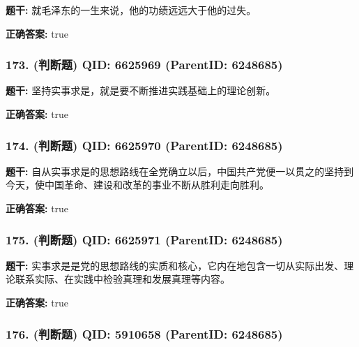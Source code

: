 \documentclass[12pt,UTF8]{ctexart}
\begin{document}
\textbf{题干:}
就毛泽东的一生来说，他的功绩远远大于他的过失。



\textbf{正确答案:}
true

\vspace{0.3em}\hrulefill\vspace{0.7em}

\subsubsection*{173. (判断题) \small QID: 6625969 (ParentID: 6248685)}

\textbf{题干:}
坚持实事求是，就是要不断推进实践基础上的理论创新。



\textbf{正确答案:}
true

\vspace{0.3em}\hrulefill\vspace{0.7em}

\subsubsection*{174. (判断题) \small QID: 6625970 (ParentID: 6248685)}

\textbf{题干:}
自从实事求是的思想路线在全党确立以后，中国共产党便一以贯之的坚持到今天，使中国革命、建设和改革的事业不断从胜利走向胜利。



\textbf{正确答案:}
true

\vspace{0.3em}\hrulefill\vspace{0.7em}

\subsubsection*{175. (判断题) \small QID: 6625971 (ParentID: 6248685)}

\textbf{题干:}
实事求是是党的思想路线的实质和核心，它内在地包含一切从实际出发、理论联系实际、在实践中检验真理和发展真理等内容。



\textbf{正确答案:}
true

\vspace{0.3em}\hrulefill\vspace{0.7em}

\subsubsection*{176. (判断题) \small QID: 5910658 (ParentID: 6248685)}
\end{document}
